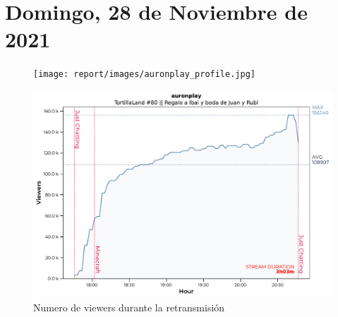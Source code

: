 \documentclass[a4paper,10pt,twoside]{report}
\begin{document}
\section*{Domingo, 28 de Noviembre de 2021}
\begin{figure}[H]
   \centering
   \texttt{[image: report/images/auronplay\_profile.jpg]}
   \caption*{ }
   \end{figure}
\begin{figure}[H]
   \centering
   \includegraphics[width=1.000000\textwidth]{data/auronplay_2021_11_28.pdf}
   \caption*{Numero de viewers durante la retransmisión}
   \end{figure}
\end{document}
